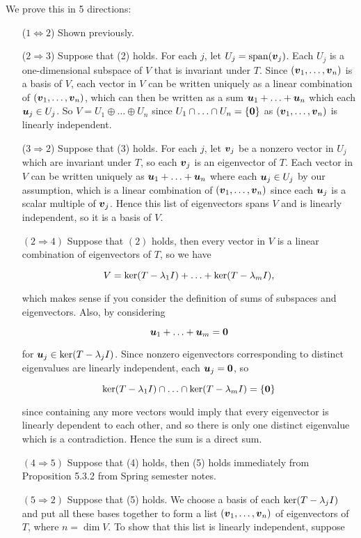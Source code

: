 \documentclass{report}
\DeclareMathOperator{\Span}{span}
\begin{document}
	\begin{myproof} We prove this in 5 directions:
		\begin{enumerate}
			\item[($1\Leftrightarrow 2$)] Shown previously.
			\item[($2\Rightarrow 3$)] Suppose that (2) holds. For each $j$, let $U_j=\Span(\bmv_j)$. Each $U_j$ is a one-dimensional subspace of $V$ that is invariant under $T$. Since $(\boldsymbol{v}_1,\ldots,\boldsymbol{v}_n)$ is a basis of $V$, each vector in $V$ can be written uniquely as a linear combination of $(\boldsymbol{v}_1,\ldots,\boldsymbol{v}_n)$, which can then be written as a sum $\boldsymbol{u}_1+\ldots+\boldsymbol{u}_n$ which each $\boldsymbol{u}_j\in U_j$. So $V=U_1\oplus\ldots\oplus U_n$ since $U_1\cap\ldots\cap U_n=\{\textbf{0}\}$ as $(\boldsymbol{v}_1,\ldots,\boldsymbol{v}_n)$ is linearly independent.
			\item[($3\Rightarrow 2$)] Suppose that (3) holds. For each $j$, let $\boldsymbol{v}_j$ be a nonzero vector in $U_j$ which are invariant under $T$, so each $\boldsymbol{v}_j$ is an eigenvector of $T$. Each vector in $V$ can be written uniquely as $\boldsymbol{u}_1+\ldots+\boldsymbol{u}_n$ where each $\boldsymbol{u}_j\in U_j$ by our assumption, which is a linear combination of $(\boldsymbol{v}_1,\ldots,\boldsymbol{v}_n)$ since each $\boldsymbol{u}_j$ is a scalar multiple of $\boldsymbol{v}_j$. Hence this list of eigenvectors spans $V$ and is linearly independent, so it is a basis of $V$.
			\item [$(2\Rightarrow 4)$] Suppose that $(2)$ holds, then every vector in $V$ is a linear combination of eigenvectors of $T$, so we have
			
			$$V=\ker(T-\lambda_1 I)+\ldots+\ker(T-\lambda_m I),$$
			
			which makes sense if you consider the definition of sums of subspaces and eigenvectors. Also, by considering
			
			$$\boldsymbol{u}_1+\ldots+\boldsymbol{u}_m=\textbf{0}$$
			
			for $\boldsymbol{u}_j\in\ker(T-\lambda_j I)$. Since nonzero eigenvectors corresponding to distinct eigenvalues are linearly independent, each $\boldsymbol{u}_j=\textbf{0}$, so
			
			$$\ker(T-\lambda_1I)\cap\ldots\cap\ker(T-\lambda_mI)=\{\textbf{0}\}$$
			
			since containing any more vectors would imply that every eigenvector is linearly dependent to each other, and so there is only one distinct eigenvalue which is a contradiction. Hence the sum is a direct sum.
			\item[$(4\Rightarrow 5)$] Suppose that (4) holds, then (5) holds immediately from Proposition 5.3.2 from Spring semester notes.
			\item[$(5\Rightarrow 2)$] Suppose that (5) holds. We choose a basis of each $\ker(T-\lambda_jI)$ and put all these bases together to form a list $(\boldsymbol{v}_1,\ldots,\boldsymbol{v}_n)$ of eigenvectors of $T$, where $n=\dim V$. To show that this list is linearly independent, suppose
			

\end{enumerate}
\end{myproof}
\end{document}
